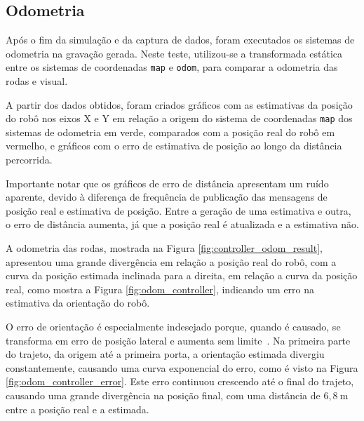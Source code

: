 \documentclass[repeatfields,xlists,xpacks,oneside,yearsonly]{ufrgscca}
\begin{document}
\subsection{Odometria}

Após o fim da simulação e da captura de dados, foram executados os
sistemas de odometria na gravação gerada. Neste teste, utilizou-se a
transformada estática entre os sistemas de coordenadas \texttt{map} e
\texttt{odom}, para comparar a odometria das rodas e visual.

A partir dos dados obtidos, foram criados gráficos com as estimativas
da posição do robô nos eixos X e Y em relação a origem do sistema de
coordenadas \texttt{map} dos sistemas de odometria em verde,
comparados com a posição real do robô em vermelho, e gráficos com o
erro de estimativa de posição ao longo da distância percorrida.

Importante notar que os gráficos de erro de distância apresentam um
ruído aparente, devido à diferença de frequência de publicação das
mensagens de posição real e estimativa de posição. Entre a geração de
uma estimativa e outra, o erro de distância aumenta, já que a posição
real é atualizada e a estimativa não.

A odometria das rodas, mostrada na Figura
\ref{fig:controller_odom_result}, apresentou uma grande divergência
em relação a posição real do robô, com a curva da posição estimada
inclinada para a direita, em relação a curva da posição real, como
mostra a Figura \ref{fig:odom_controller}, indicando um erro na
estimativa da orientação do robô.

O erro de orientação é especialmente indesejado porque, quando é
causado, se transforma em erro de posição lateral e aumenta sem
limite~\cite{borenstein}. Na primeira parte do trajeto, da origem até
a primeira porta, a orientação estimada divergiu constantemente,
causando uma curva exponencial do erro, como é visto na Figura
\ref{fig:odom_controller_error}. Este erro continuou crescendo até o
final do trajeto, causando uma grande divergência na posição final,
com uma distância de $6,8~\si{\meter}$ entre a posição real e a
estimada.
\end{document}
